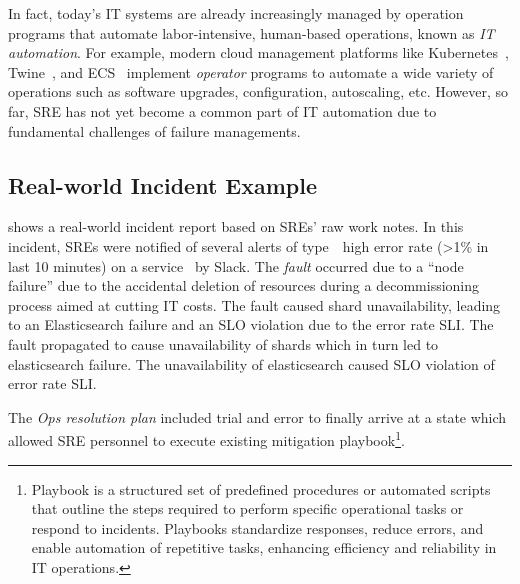In fact, today's IT systems are already increasingly managed by operation programs that automate labor-intensive, human-based operations, known as {\it IT automation}. For example, 
modern cloud management platforms like Kubernetes~\cite{Burns:2016}, 
    Twine~\cite{Tang:2020}, and ECS~\cite{ecs} implement {\it operator} programs to automate a wide variety of operations such as software upgrades, configuration, autoscaling, etc.
However, so far, SRE has not yet become a common part of IT automation due to fundamental challenges of failure managements.



































\subsection{Real-world Incident Example}
\label{ss:sre-tasks}
 shows a real-world incident report based on SREs' raw work notes. 
In this incident, SREs were notified of several alerts of type~\textemdash~high error rate (>1\% in last 10 minutes) on a service \textemdash~by Slack. 
The \textit{fault} occurred due to a ``node failure'' due to the accidental deletion of resources during a decommissioning process aimed at cutting IT costs.
The fault caused shard unavailability, leading to an Elasticsearch failure and an SLO violation due to the error rate SLI.
The fault propagated to cause unavailability of shards which in turn led to elasticsearch failure. 
The unavailability of elasticsearch caused SLO violation of error rate SLI.

The \textit{Ops resolution plan} included trial and error to finally arrive at a state which allowed SRE personnel to execute existing mitigation playbook\footnote{Playbook is a structured set of predefined procedures or automated scripts that outline the steps required to perform specific operational tasks or respond to incidents. Playbooks standardize responses, reduce errors, and enable automation of repetitive tasks, enhancing efficiency and reliability in IT operations.}.


